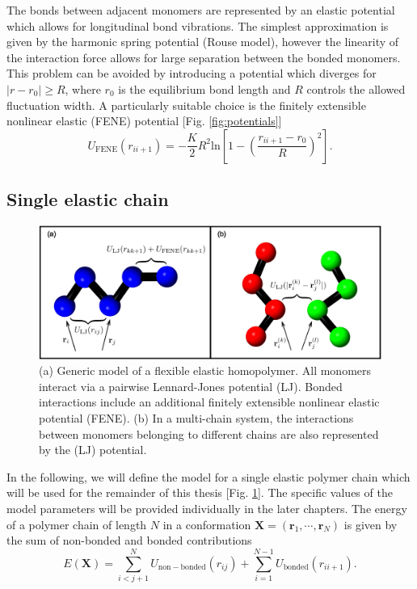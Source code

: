 \documentclass[12pt]{report}
\begin{document}
The bonds between adjacent monomers are represented by an elastic potential which allows for longitudinal bond vibrations. The simplest approximation is given by the harmonic spring potential (Rouse model), however the linearity of the interaction force allows for large separation between the bonded monomers. This problem can be avoided by introducing a potential which diverges for $|r-r_{0}|\geq R$, where $r_0$ is the equilibrium bond length and $R$ controls the allowed fluctuation width. A particularly suitable choice is the finitely extensible nonlinear elastic (FENE) potential [Fig.\,\,\ref{fig:potentials}]\cite{Bird1987,Kremer1990,Milchev2001}
%
\begin{equation}
\label{eq:FENE}
U_{\mathrm{FENE}}(r_{ii+1})=-\frac{K}{2}R^2 
\mathrm{ln}\left[1-\left(\frac{r_{ii+1}-r_0}{R}\right)^2\right].
\end{equation}
%


\subsection{Single elastic chain}
\label{subsec:ElasticChain}
%
\begin{figure}
\center
\includegraphics[width = 1.01\textwidth]{chapter4Figs/polymerModel.eps}
\caption{\label{fig:singleChain}%
(a) Generic model of a flexible elastic homopolymer. All monomers interact via a pairwise Lennard-Jones potential (LJ). Bonded interactions include an additional finitely extensible nonlinear elastic potential (FENE). (b) In a multi-chain system, the interactions between monomers belonging to different chains are also represented by the (LJ) potential.
}
\end{figure}
% 
In the following, we will define the model for a single elastic polymer chain which will be used for the remainder of this thesis [Fig.\,\,\ref{fig:singleChain}]. The specific values of the model parameters will be provided individually in the later chapters. The energy of a polymer chain of length $N$ in a conformation $\mathbf{X} = (\mathbf{r}_1,\cdots,\mathbf{r}_{N})$ is given by the sum of non-bonded and bonded contributions
\begin{equation}
E(\mathbf{X}) = \sum^{N}_{i<j+1}
U_{\mathrm{non-bonded}}(r_{ij}) + \sum^{N-1}_{i=1} 	
U_{\mathrm{bonded}}(r_{ii+1}). 
\label{totalE}
\end{equation}
%
 
\end{document}
